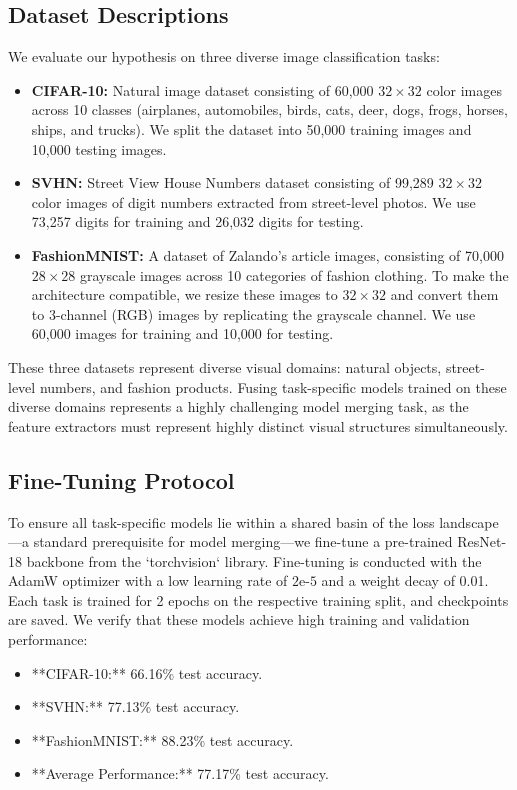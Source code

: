 \documentclass{article}
\begin{document}
\subsection{Dataset Descriptions}
We evaluate our hypothesis on three diverse image classification tasks:
\begin{itemize}
\item \textbf{CIFAR-10:} Natural image dataset consisting of 60,000 $32 \times 32$ color images across 10 classes (airplanes, automobiles, birds, cats, deer, dogs, frogs, horses, ships, and trucks). We split the dataset into 50,000 training images and 10,000 testing images.
\item \textbf{SVHN:} Street View House Numbers dataset consisting of 99,289 $32 \times 32$ color images of digit numbers extracted from street-level photos. We use 73,257 digits for training and 26,032 digits for testing.
\item \textbf{FashionMNIST:} A dataset of Zalando's article images, consisting of 70,000 $28 \times 28$ grayscale images across 10 categories of fashion clothing. To make the architecture compatible, we resize these images to $32 \times 32$ and convert them to 3-channel (RGB) images by replicating the grayscale channel. We use 60,000 images for training and 10,000 for testing.
\end{itemize}

These three datasets represent diverse visual domains: natural objects, street-level numbers, and fashion products. Fusing task-specific models trained on these diverse domains represents a highly challenging model merging task, as the feature extractors must represent highly distinct visual structures simultaneously.

\subsection{Fine-Tuning Protocol}
To ensure all task-specific models lie within a shared basin of the loss landscape—a standard prerequisite for model merging—we fine-tune a pre-trained ResNet-18 backbone from the `torchvision` library. Fine-tuning is conducted with the AdamW optimizer with a low learning rate of $2\text{e-}5$ and a weight decay of 0.01. Each task is trained for 2 epochs on the respective training split, and checkpoints are saved. We verify that these models achieve high training and validation performance:
\begin{itemize}
\item **CIFAR-10:** 66.16\% test accuracy.
\item **SVHN:** 77.13\% test accuracy.
\item **FashionMNIST:** 88.23\% test accuracy.
\item **Average Performance:** 77.17\% test accuracy.
\end{itemize}
\end{document}
